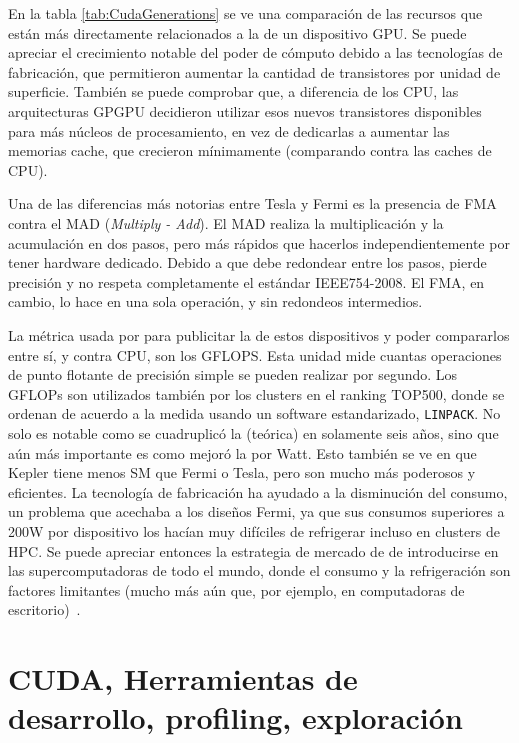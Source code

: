 En la tabla \ref{tab:CudaGenerations} se ve una comparaci\'on de las recursos que est\'an m\'as directamente relacionados a la \performance{} de un dispositivo GPU.
Se puede apreciar el crecimiento notable del poder de c\'omputo debido a las tecnolog\'ias de fabricaci\'on, que permitieron aumentar la cantidad de transistores por unidad de superficie.
Tambi\'en se puede comprobar que, a diferencia de los CPU, las arquitecturas GPGPU decidieron utilizar esos nuevos transistores disponibles para m\'as n\'ucleos de procesamiento, en vez
de dedicarlas a aumentar las memorias cache, que crecieron m\'inimamente (comparando contra las caches de CPU).

Una de las diferencias m\'as notorias entre Tesla y Fermi es la presencia de FMA contra el MAD (\textit{Multiply - Add}).
El MAD realiza la multiplicaci\'on y la acumulaci\'on en dos pasos, pero m\'as r\'apidos que hacerlos independientemente por tener hardware dedicado.
Debido a que debe redondear entre los pasos, pierde precisi\'on y no respeta completamente el est\'andar IEEE754-2008.
El FMA, en cambio, lo hace en una sola operaci\'on, y sin redondeos intermedios.

La m\'etrica usada por \nvidia{} para publicitar la \performance{} de estos dispositivos y poder compararlos entre s\'i, y contra CPU, son los GFLOPS.
Esta unidad mide cuantas operaciones de punto flotante de precisi\'on simple se pueden realizar por segundo.
Los GFLOPs son utilizados tambi\'en por los clusters en el ranking TOP500, donde se ordenan de acuerdo a la \performance{} medida usando un software estandarizado, \texttt{LINPACK}.
No solo es notable como se cuadruplic\'o la \performance{} (te\'orica) en solamente seis a\~nos, sino que a\'un m\'as importante es como mejor\'o la \performance{} por Watt.
Esto tambi\'en se ve en que Kepler tiene menos SM que Fermi o Tesla, pero son mucho m\'as poderosos y eficientes.
La tecnolog\'ia de fabricaci\'on ha ayudado a la disminuci\'on del consumo, un problema que acechaba a los dise\~nos Fermi, ya que sus consumos superiores a 200W por dispositivo los hac\'ian muy dif\'iciles de refrigerar incluso en clusters de HPC.
Se puede apreciar entonces la estrategia de mercado de \nvidia{} de introducirse en las supercomputadoras de todo el mundo, donde el consumo y la refrigeraci\'on son factores limitantes (mucho m\'as a\'un que, por ejemplo, en computadoras de escritorio)~\cite{HennessyPatterson}.

\section{CUDA, Herramientas de desarrollo, profiling, exploraci\'on}

